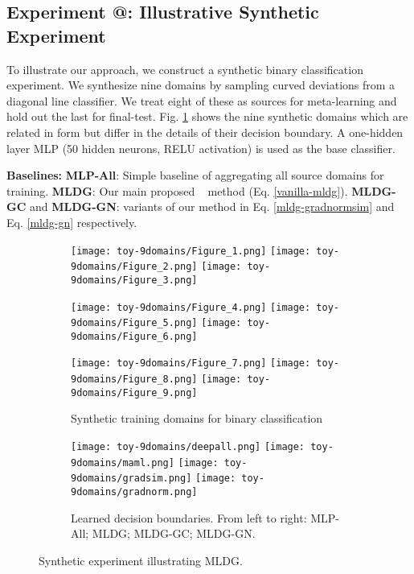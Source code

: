 \documentclass[letterpaper]{article} \usepackage{aaai18}  \usepackage{times}  \usepackage{helvet}  \usepackage{courier}  \usepackage{url}  \usepackage{graphicx}  \usepackage{amsmath}
\makeatletter
\newcommand*{\rom}[1]{\expandafter\@slowromancap\romannumeral #1@}
\newcommand{\name}[1]{MLDG}
\makeatother
\begin{document}
{\subsection{Experiment \rom{1}: Illustrative Synthetic Experiment}
To illustrate our approach, we construct a synthetic binary classification experiment. We synthesize nine domains by sampling curved deviations from a diagonal line classifier. We treat eight of these as sources for meta-learning and hold out the last for final-test. Fig. \ref{toy} shows the nine synthetic domains which are related in form but differ in the details of their decision boundary. A one-hidden layer MLP (50 hidden neurons, RELU activation) is used as the base classifier. 



\vspace{0.1cm}\noindent \textbf{Baselines:} \quad \textbf{MLP-All}: Simple baseline of aggregating all source domains for training. \textbf{MLDG}: Our main proposed \name~ method (Eq. \ref{vanilla-mldg}). 
\textbf{MLDG-GC} and \textbf{MLDG-GN}: variants of our method in 
Eq. \ref{mldg-gradnormsim} and Eq. \ref{mldg-gn} respectively.

\begin{figure}[t]
\centering
\begin{subfigure}{1.0\columnwidth}
\texttt{[image: toy-9domains/Figure\_1.png]}
\texttt{[image: toy-9domains/Figure\_2.png]}
\texttt{[image: toy-9domains/Figure\_3.png]}

\texttt{[image: toy-9domains/Figure\_4.png]}
\texttt{[image: toy-9domains/Figure\_5.png]}
\texttt{[image: toy-9domains/Figure\_6.png]}

\texttt{[image: toy-9domains/Figure\_7.png]}
\texttt{[image: toy-9domains/Figure\_8.png]}
\texttt{[image: toy-9domains/Figure\_9.png]}
\caption{Synthetic training domains for binary classification}
\label{toy}
\end{subfigure}
\begin{subfigure}{1.0\columnwidth}
\centering
\texttt{[image: toy-9domains/deepall.png]}
\texttt{[image: toy-9domains/maml.png]}
\texttt{[image: toy-9domains/gradsim.png]}
\texttt{[image: toy-9domains/gradnorm.png]}
\caption{Learned decision boundaries. From left to right: MLP-All; MLDG; MLDG-GC; MLDG-GN.}
\end{subfigure}
\caption{Synthetic experiment illustrating MLDG.}
\label{toy-res}
\end{figure}


}
\end{document}
